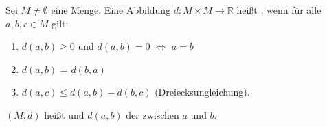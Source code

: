 Sei $M \neq \emptyset$ eine Menge. Eine Abbildung $d: M \times M \to \mathbb{R}$ heißt , wenn für alle $a, b, c \in M$ gilt:
\begin{enumerate}[label=(M\arabic*)]
    \item $d(a, b) \geq 0$ und $d(a, b) = 0$ $\Leftrightarrow$ $a=b$
    \item $d(a, b)$ = $d(b, a)$
    \item $d(a, c) \leq d(a, b) - d(b, c)$ (Dreiecksungleichung).
\end{enumerate}
$(M, d)$ heißt  und $d(a, b)$ der  zwischen $a$ und $b$.